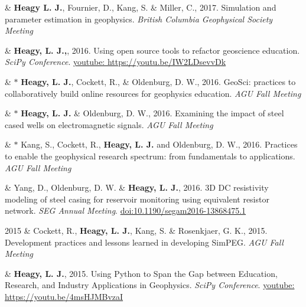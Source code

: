 \documentclass[a4paper, 11pt]{article}
\newcommand{\doi}[1]{\href{https://doi.org/#1}{doi:#1}}
\newcommand{\youtube}[1]{\href{https://youtu.be/XY3Tq9Wd1\_A}{youtube: #1}}
\begin{document}
\begin{entryright}
& \textbf{Heagy L. J.}, Fournier, D., Kang, S. \& Miller, C., 2017. Simulation and parameter estimation in geophysics. \emph{British Columbia Geophysical Society Meeting}
\end{entryright}

\begin{entryright}
& \textbf{Heagy, L. J.,}, 2016. Using open source tools to refactor geoscience education. \emph{SciPy Conference}. \youtube{https://youtu.be/IW2LDsevvDk}
\end{entryright}

\begin{entryright}
& $*$ \textbf{Heagy, L. J.}, Cockett, R., \& Oldenburg, D. W., 2016. GeoSci: practices to collaboratively build online resources for geophysics education. \emph{AGU Fall Meeting}
\end{entryright}

\begin{entryright}
& $*$ \textbf{Heagy, L. J.} \& Oldenburg, D. W., 2016. Examining the impact of steel cased wells on electromagnetic signals. \emph{AGU Fall Meeting}
\end{entryright}

\begin{entryright}
& $*$ Kang, S., Cockett, R., \textbf{Heagy, L. J.} and Oldenburg, D. W., 2016. Practices to enable the geophysical research spectrum: from fundamentals to applications. \emph{AGU Fall Meeting}
\end{entryright}

\begin{entryright}
& Yang, D., Oldenburg, D. W. \& \textbf{Heagy, L. J.}, 2016. 3D DC resistivity modeling of steel casing for reservoir monitoring using equivalent resistor network. \emph{SEG Annual Meeting}. \doi{10.1190/segam2016-13868475.1}
\end{entryright}

\begin{entryright}
2015 & Cockett, R., \textbf{Heagy, L. J.}, Kang, S. \& Rosenkjaer, G. K., 2015. Development practices and lessons learned in developing SimPEG. \emph{AGU Fall Meeting}
\end{entryright}

\begin{entryright}
& \textbf{Heagy, L. J.}, 2015. Using Python to Span the Gap between Education, Research, and Industry Applications in Geophysics. \emph{SciPy Conference}. \youtube{https://youtu.be/4msHJMBvzaI}
\end{entryright}
\end{document}
